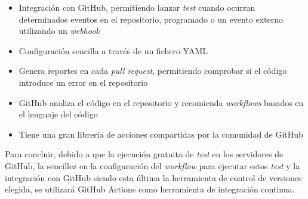 \begin{itemize}
    \item Integración con GitHub, permitiendo lanzar \emph{test} cuando ocurran determinados eventos en el repositorio, programado o un evento externo utilizando un \emph{webhook}
    \item Configuración sencilla a través de un fichero YAML
    \item Genera reportes en cada \emph{pull request}, permitiendo comprobar si el código introduce un error en el repositorio
    \item GitHub analiza el código en el repositorio y recomienda \emph{workflows} basados en el lenguaje del código
    \item Tiene una gran librería de acciones compartidas por la comunidad de GitHub
\end{itemize}

Para concluir, debido a que la ejecución gratuita de \emph{test} en los servidores de GitHub, la sencillez en la configuración del \emph{workflow} para ejecutar estos \emph{test} y la integración con GitHub siendo esta última la herramienta de control de versiones elegida, se utilizará GitHub Actions como herramienta de integración continua.





